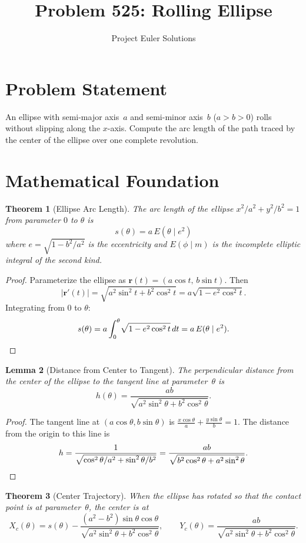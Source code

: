\documentclass[11pt]{article}
\title{Problem 525: Rolling Ellipse}
\author{Project Euler Solutions}
\date{}
\newtheorem{theorem}{Theorem}
\newtheorem{lemma}[theorem]{Lemma}
\begin{document}
\maketitle

\section{Problem Statement}
An ellipse with semi-major axis~$a$ and semi-minor axis~$b$ ($a > b > 0$) rolls without slipping along the $x$-axis. Compute the arc length of the path traced by the center of the ellipse over one complete revolution.

\section{Mathematical Foundation}

\begin{theorem}[Ellipse Arc Length]
The arc length of the ellipse $x^2/a^2 + y^2/b^2 = 1$ from parameter $0$ to $\theta$ is
\[
s(\theta) = a\,E(\theta \mid e^2)
\]
where $e = \sqrt{1 - b^2/a^2}$ is the eccentricity and $E(\phi \mid m)$ is the incomplete elliptic integral of the second kind.
\end{theorem}

\begin{proof}
Parameterize the ellipse as $\mathbf{r}(t) = (a\cos t,\, b\sin t)$. Then
\[
|\mathbf{r}'(t)| = \sqrt{a^2\sin^2 t + b^2\cos^2 t} = a\sqrt{1 - e^2\cos^2 t}.
\]
Integrating from $0$ to $\theta$:
\[
s(\theta) = a\int_0^{\theta}\!\sqrt{1 - e^2\cos^2 t}\,dt = a\,E(\theta \mid e^2). \qedhere
\]
\end{proof}

\begin{lemma}[Distance from Center to Tangent]
The perpendicular distance from the center of the ellipse to the tangent line at parameter~$\theta$ is
\[
h(\theta) = \frac{ab}{\sqrt{a^2\sin^2\theta + b^2\cos^2\theta}}.
\]
\end{lemma}

\begin{proof}
The tangent line at $(a\cos\theta, b\sin\theta)$ is $\frac{x\cos\theta}{a} + \frac{y\sin\theta}{b} = 1$. The distance from the origin to this line is
\[
h = \frac{1}{\sqrt{\cos^2\theta/a^2 + \sin^2\theta/b^2}} = \frac{ab}{\sqrt{b^2\cos^2\theta + a^2\sin^2\theta}}. \qedhere
\]
\end{proof}

\begin{theorem}[Center Trajectory]
When the ellipse has rotated so that the contact point is at parameter~$\theta$, the center is at
\[
X_c(\theta) = s(\theta) - \frac{(a^2-b^2)\sin\theta\cos\theta}{\sqrt{a^2\sin^2\theta + b^2\cos^2\theta}}, \qquad
Y_c(\theta) = \frac{ab}{\sqrt{a^2\sin^2\theta + b^2\cos^2\theta}}.
\]
\end{theorem}
\end{document}

